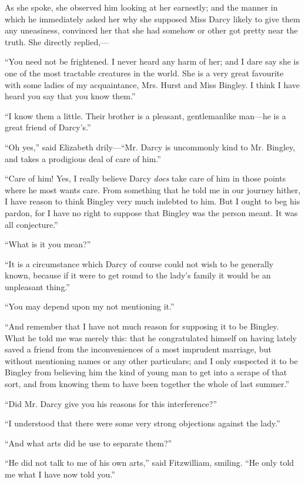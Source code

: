 \documentclass[12pt]{book}
\begin{document}
As she spoke, she observed him looking at her earnestly; and the manner in which he immediately asked her why she supposed Miss Darcy likely to give them any uneasiness, convinced her that she had somehow or other got pretty near the truth. She directly replied,---

``You need not be frightened. I never heard any harm of her; and I dare say she is one of the most tractable creatures in the world. She is a very great favourite with some ladies of my acquaintance, Mrs. Hurst and Miss Bingley. I think I have heard you say that you know them.''

``I know them a little. Their brother is a pleasant, gentlemanlike man---he is a great friend of Darcy's.''

``Oh yes,'' said Elizabeth drily---``Mr. Darcy is uncommonly kind to Mr. Bingley, and takes a prodigious deal of care of him.''

``Care of him! Yes, I really believe Darcy \textit{does} take care of him in those points where he most wants care. From something that he told me in our journey hither, I have reason to think Bingley very much indebted to him. But I ought to beg his pardon, for I have no right to suppose that Bingley was the person meant. It was all conjecture.''

``What is it you mean?''

``It is a circumstance which Darcy of course could not wish to be generally known, because if it were to get round to the lady's family it would be an unpleasant thing.''

``You may depend upon my not mentioning it.''

``And remember that I have not much reason for supposing it to be Bingley. What he told me was merely this: that he congratulated himself on having lately saved a friend from the inconveniences of a most imprudent marriage, but without mentioning names or any other particulars; and I only suspected it to be Bingley from believing him the kind of young man to get into a scrape of that sort, and from knowing them to have been together the whole of last summer.''

``Did Mr. Darcy give you his reasons for this interference?''

``I understood that there were some very strong objections against the lady.''

``And what arts did he use to separate them?''

``He did not talk to me of his own arts,'' said Fitzwilliam, smiling. ``He only told me what I have now told you.''
\end{document}

